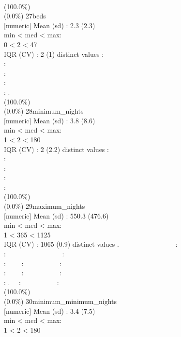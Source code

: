 \documentclass[
  journal,
]{IEEEtran}%
\begin{document}
~ ~ ~ ~ ~ \\
(100.0\%) \\
(0.0\%) \textbar{} \textbar{} 27\textbar beds\\
{[}numeric{]} \textbar Mean (sd) : 2.3 (2.3)\\
min \textless{} med \textless{} max:\\
0 \textless{} 2 \textless{} 47\\
IQR (CV) : 2 (1)  distinct values \textbar{} \textbar:\\
:\\
:\\
:\\
: . \\
(100.0\%) \\
(0.0\%) \textbar{} \textbar{} 28\textbar minimum\_nights\\
{[}numeric{]} \textbar Mean (sd) : 3.8 (8.6)\\
min \textless{} med \textless{} max:\\
1 \textless{} 2 \textless{} 180\\
IQR (CV) : 2 (2.2)  distinct values \textbar{} \textbar:\\
:\\
:\\
:\\
: \\
(100.0\%) \\
(0.0\%) \textbar{} \textbar{} 29\textbar maximum\_nights\\
{[}numeric{]} \textbar Mean (sd) : 550.3 (476.6)\\
min \textless{} med \textless{} max:\\
1 \textless{} 365 \textless{} 1125\\
IQR (CV) : 1065 (0.9)  distinct values \textbar{} \textbar.
~~~~~~~~~~~~~~~~:\\
: ~~~~~~~~~~~~~~~~:\\
: ~~~~: ~~~~~~~~~~:\\
: ~~~~: ~~~~~~~~~~:\\
: . ~~: ~~~~~~~~~~: \\
(100.0\%) \\
(0.0\%) \textbar{} \textbar{} 30\textbar minimum\_minimum\_nights\\
{[}numeric{]} \textbar Mean (sd) : 3.4 (7.5)\\
min \textless{} med \textless{} max:\\
1 \textless{} 2 \textless{} 180\\
\end{document}
